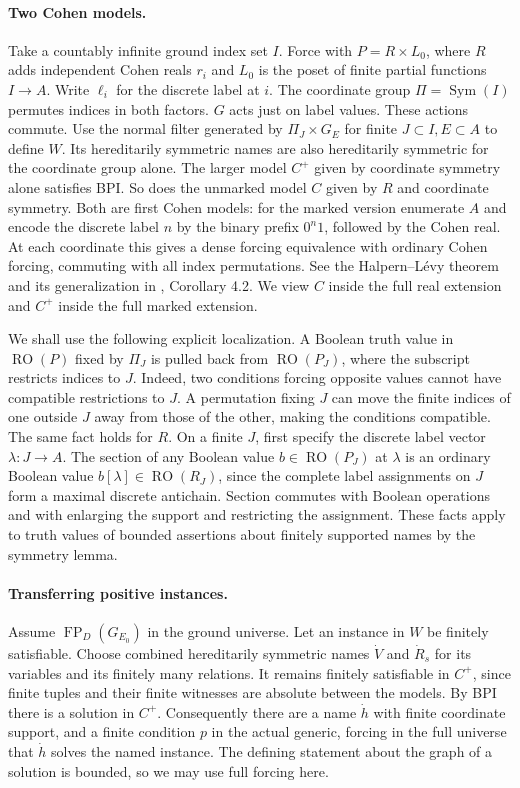 \documentclass[11pt]{article}
\newcommand{\FP}{\operatorname{FP}}
\newcommand{\RO}{\operatorname{RO}}
\begin{document}
\paragraph{Two Cohen models.}
Take a countably infinite ground index set $I$. Force with $P=R\times L_0$, where $R$ adds independent Cohen reals $r_i$ and $L_0$ is the poset of finite partial functions $I\to A$. Write $\ell_i$ for the discrete label at $i$. The coordinate group $\Pi=\operatorname{Sym}(I)$ permutes indices in both factors. $G$ acts just on label values. These actions commute. Use the normal filter generated by $\Pi_J\times G_E$ for finite $J\subset I,E\subset A$ to define $W$. Its hereditarily symmetric names are also hereditarily symmetric for the coordinate group alone. The larger model $C^+$ given by coordinate symmetry alone satisfies BPI. So does the unmarked model $C$ given by $R$ and coordinate symmetry. Both are first Cohen models: for the marked version enumerate $A$ and encode the discrete label $n$ by the binary prefix $0^n1$, followed by the Cohen real. At each coordinate this gives a dense forcing equivalence with ordinary Cohen forcing, commuting with all index permutations. See the Halpern--L\'evy theorem and its generalization in \cite{ransom}, Corollary 4.2. We view $C$ inside the full real extension and $C^+$ inside the full marked extension.

We shall use the following explicit localization. A Boolean truth value in $\RO(P)$ fixed by $\Pi_J$ is pulled back from $\RO(P_J)$, where the subscript restricts indices to $J$. Indeed, two conditions forcing opposite values cannot have compatible restrictions to $J$. A permutation fixing $J$ can move the finite indices of one outside $J$ away from those of the other, making the conditions compatible. The same fact holds for $R$. On a finite $J$, first specify the discrete label vector $\lambda:J\to A$. The section of any Boolean value $b\in\RO(P_J)$ at $\lambda$ is an ordinary Boolean value $b[\lambda]\in\RO(R_J)$, since the complete label assignments on $J$ form a maximal discrete antichain. Section commutes with Boolean operations and with enlarging the support and restricting the assignment. These facts apply to truth values of bounded assertions about finitely supported names by the symmetry lemma.

\paragraph{Transferring positive instances.}
Assume $\FP_D(G_{E_0})$ in the ground universe. Let an instance in $W$ be finitely satisfiable. Choose combined hereditarily symmetric names $\dot V$ and $\dot R_s$ for its variables and its finitely many relations. It remains finitely satisfiable in $C^+$, since finite tuples and their finite witnesses are absolute between the models. By BPI there is a solution in $C^+$. Consequently there are a name $\dot h$ with finite coordinate support, and a finite condition $p$ in the actual generic, forcing in the full universe that $\dot h$ solves the named instance. The defining statement about the graph of a solution is bounded, so we may use full forcing here.
\end{document}

